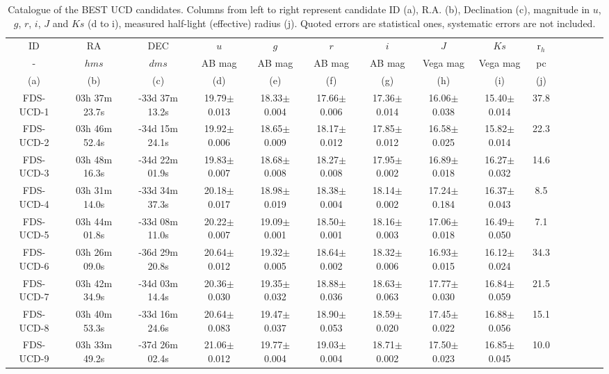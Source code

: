 \documentclass[fleqn,usenatbib]{mnras}
\begin{document}
\begin{table*}
\caption {Catalogue of the BEST UCD candidates. Columns from left to right represent candidate ID (a), R.A. (b), Declination (c), magnitude in $u$, $g$, $r$, $i$, $J$ and $Ks$ (d to i), measured half-light (effective) radius (j). Quoted errors are statistical ones, systematic errors are not included.}
\begin{tabular}{ ccccccccccccccc } \hline  
ID & RA & DEC & $u$ & $g$ & $r$ & $i$ & $J$ & $Ks$ & r$_h$ \\
- & $hms$ & $dms$ & AB mag & AB mag & AB mag & AB mag & Vega mag & Vega mag & pc \\
(a) & (b) &  (c) &  (d) &  (e) &  (f) &  (g)  &  (h) & (i) & (j)\\
\hline

FDS-UCD-1 & 03h 37m 23.7s & -33d 37m 13.2s & 19.79$\pm$0.013 & 18.33$\pm$0.004 & 17.66$\pm$0.006 & 17.36$\pm$0.014 & 16.06$\pm$0.038 & 15.40$\pm$0.014 & 37.8 \\ 
FDS-UCD-2 & 03h 46m 52.4s & -34d 15m 24.1s & 19.92$\pm$0.006 & 18.65$\pm$0.009 & 18.17$\pm$0.012 & 17.85$\pm$0.012 & 16.58$\pm$0.025 & 15.82$\pm$0.014 & 22.3 \\ 
FDS-UCD-3 & 03h 48m 16.3s & -34d 22m 01.9s & 19.83$\pm$0.007 & 18.68$\pm$0.008 & 18.27$\pm$0.008 & 17.95$\pm$0.002 & 16.89$\pm$0.018 & 16.27$\pm$0.032 & 14.6 \\ 
FDS-UCD-4 & 03h 31m 14.0s & -33d 34m 37.3s & 20.18$\pm$0.017 & 18.98$\pm$0.019 & 18.38$\pm$0.004 & 18.14$\pm$0.002 & 17.24$\pm$0.184 & 16.37$\pm$0.043 & 8.5 \\ 
FDS-UCD-5 & 03h 44m 01.8s & -33d 08m 11.0s & 20.22$\pm$0.007 & 19.09$\pm$0.001 & 18.50$\pm$0.001 & 18.16$\pm$0.003 & 17.06$\pm$0.018 & 16.49$\pm$0.050 & 7.1 \\ 
FDS-UCD-6 & 03h 26m 09.0s & -36d 29m 20.8s & 20.64$\pm$0.012 & 19.32$\pm$0.005 & 18.64$\pm$0.002 & 18.32$\pm$0.006 & 16.93$\pm$0.015 & 16.12$\pm$0.024 & 34.3 \\ 
FDS-UCD-7 & 03h 42m 34.9s & -34d 03m 14.4s & 20.36$\pm$0.030 & 19.35$\pm$0.032 & 18.88$\pm$0.036 & 18.63$\pm$0.063 & 17.77$\pm$0.030 & 16.84$\pm$0.059 & 21.5 \\ 
FDS-UCD-8 & 03h 40m 53.3s & -33d 16m 24.6s & 20.64$\pm$0.083 & 19.47$\pm$0.037 & 18.90$\pm$0.053 & 18.59$\pm$0.020 & 17.45$\pm$0.022 & 16.88$\pm$0.056 & 15.1 \\ 
FDS-UCD-9 & 03h 33m 49.2s & -37d 26m 02.4s & 21.06$\pm$0.012 & 19.77$\pm$0.004 & 19.03$\pm$0.004 & 18.71$\pm$0.002 & 17.50$\pm$0.023 & 16.85$\pm$0.045 & 10.0 \\ 

\end{tabular}
\end{table*}
\end{document}
